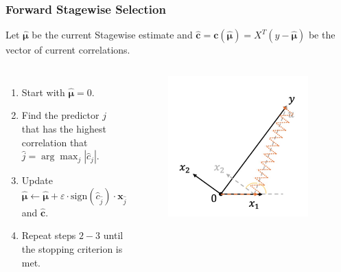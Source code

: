 \begin{frame}
\frametitle{Forward Stagewise Selection}
Let $\hat{\mathbf{\mu}}$ be the current Stagewise estimate and $\hat{\mathbf{c}}=\mathbf{c}(\hat{\mathbf{\mu}})=X^T(y-\hat{\mathbf{\mu}})$ be the vector of current correlations.

\begin{columns}[t]
    \begin{enumerate}
        \item Start with $\hat{\mathbf{\mu}}=0$.
        \item Find the predictor $j$ that has the highest correlation that $\hat{j}=\arg\max_{j}|\hat{c}_j|$.
        \item Update $\hat{\mathbf{\mu}}\leftarrow\hat{\mathbf{\mu}}+\varepsilon\cdot\text{sign}(\hat{c}_{\hat{j}})\cdot\mathbf{x}_{\hat{j}}$ and $\mathbf{\hat{c}}$.
        \item Repeat steps $2-3$ until the stopping criterion is met.
    \end{enumerate}
    
    \begin{figure}[!htbp]
        \begin{center}
            \includegraphics[width=0.9\textwidth]{img/FStageR/2.jpeg}
        \end{center}
    \end{figure}
\end{columns}
\end{frame}

